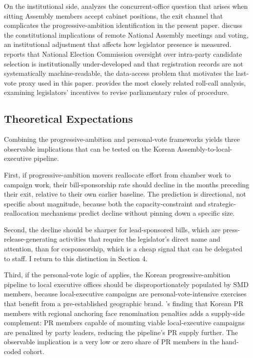 \documentclass[11pt]{article}
\begin{document}
On the institutional side, \citet{lee2020} analyzes the concurrent-office question that arises when sitting Assembly members accept cabinet positions, the exit channel that complicates the progressive-ambition identification in the present paper. \citet{kimkangpark2020} discuss the constitutional implications of remote National Assembly meetings and voting, an institutional adjustment that affects how legislator presence is measured. \citet{hwang2025} reports that National Election Commission oversight over intra-party candidate selection is institutionally under-developed and that registration records are not systematically machine-readable, the data-access problem that motivates the last-vote proxy used in this paper. \citet{seo2018} provides the most closely related roll-call analysis, examining legislators' incentives to revise parliamentary rules of procedure.

\subsection{Theoretical Expectations}

Combining the progressive-ambition and personal-vote frameworks yields three observable implications that can be tested on the Korean Assembly-to-local-executive pipeline.

First, if progressive-ambition movers reallocate effort from chamber work to campaign work, their bill-sponsorship rate should decline in the months preceding their exit, relative to their own earlier baseline. The prediction is directional, not specific about magnitude, because both the capacity-constraint and strategic-reallocation mechanisms predict decline without pinning down a specific size.

Second, the decline should be sharper for lead-sponsored bills, which are press-release-generating activities that require the legislator's direct name and attention, than for cosponsorship, which is a cheap signal that can be delegated to staff. I return to this distinction in Section 4.

Third, if the personal-vote logic of \citet{careyshugart1995} applies, the Korean progressive-ambition pipeline to local executive offices should be disproportionately populated by SMD members, because local-executive campaigns are personal-vote-intensive exercises that benefit from a pre-established geographic brand. \citet{im2025}'s finding that Korean PR members with regional anchoring face renomination penalties adds a supply-side complement: PR members capable of mounting viable local-executive campaigns are penalized by party leaders, reducing the pipeline's PR supply further. The observable implication is a very low or zero share of PR members in the hand-coded cohort.
\end{document}
